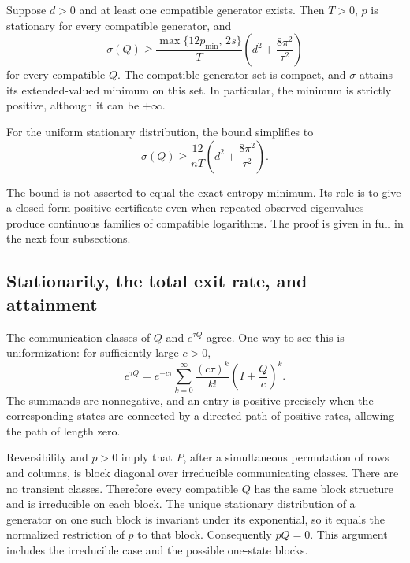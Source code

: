 \begin{theorem}
\label{thm:general-bound}
Suppose $d>0$ and at least one compatible generator exists. Then $T>0$,
$p$ is stationary for every compatible generator, and
\begin{equation}
 \boxed{\displaystyle
 \sigma(Q)\geq
 \frac{\max\{12p_{\min},\,2s\}}{T}
 \left(d^2+\frac{8\pi^2}{\tau^2}\right)
 }
 \label{eq:gb-main}
\end{equation}
for every compatible $Q$. The compatible-generator set is compact, and
$\sigma$ attains its extended-valued minimum on this set. In particular,
the minimum is strictly positive, although it can be $+\infty$.

For the uniform stationary distribution, the bound simplifies to
\begin{equation}
 \sigma(Q)\geq\frac{12}{nT}
 \left(d^2+\frac{8\pi^2}{\tau^2}\right).
 \label{eq:gb-uniform}
\end{equation}
\end{theorem}

The bound is not asserted to equal the exact entropy minimum. Its role
is to give a closed-form positive certificate even when repeated
observed eigenvalues produce continuous families of compatible
logarithms. The proof is given in full in the next four subsections.

\subsection{Stationarity, the total exit rate, and attainment}

The communication classes of $Q$ and $e^{\tau Q}$ agree. One way to see
this is uniformization: for sufficiently large $c>0$,
\[
 e^{\tau Q}=e^{-c\tau}
 \sum_{k=0}^{\infty}\frac{(c\tau)^k}{k!}
 \left(I+\frac{Q}{c}\right)^k.
\]
The summands are nonnegative, and an entry is positive precisely when
the corresponding states are connected by a directed path of positive
rates, allowing the path of length zero.

Reversibility and $p>0$ imply that $P$, after a simultaneous permutation
of rows and columns, is block diagonal over irreducible communicating
classes. There are no transient classes. Therefore every compatible
$Q$ has the same block structure and is irreducible on each block.
The unique stationary distribution of a generator on one such block is
invariant under its exponential, so it equals the normalized restriction
of $p$ to that block. Consequently $pQ=0$. This argument includes the
irreducible case and the possible one-state blocks.

